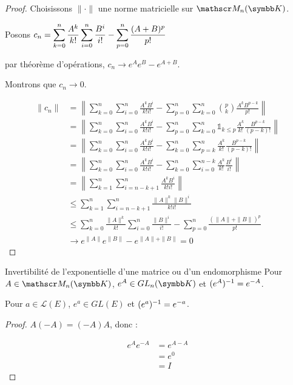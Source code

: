 \begin{proof}
    Choisissons $\| \cdot \|$ une norme matricielle sur $\mathscr M_n(\K)$. 

    Posons $\displaystyle c_n = \sum_{k = 0}^{n} \frac{A^k}{k!} \sum_{i = 0}^{n } \frac{B^i}{i!} - \sum_{p = 0}^{n} \frac{(A + B)^p}{p!}$

    par théorème d'opérations, $c_n \to e^A e^B - e^{A + B}$.

    Montrons que $c_n \to 0$.  

    \begin{align}
        \| c_n \| & = \left\| \sum_{k = 0}^{n} \sum_{i = 0}^{n} \frac{A^k B^i}{k! i!} - \sum_{p = 0}^{n} \sum_{k = 0}^{n } \binom p k \frac{A^k B^{p - k}}{p!} \right\| \\
        & = \left\| \sum_{k = 0}^n \sum_{i = 0}^{n} \frac{A^k B^i}{k! i!} - \sum_{p = 0}^{n} \sum_{k = 0}^{n} \mathbb 1_{k \leqslant p} \frac{A^k}{k!} \frac{B^{p - k}}{(p - k)!} \right\| \\
        & = \left\| \sum_{k = 0}^{n} \sum_{i = 0}^{n} \frac{A^k B^i}{k! i!} - \sum_{k = 0}^{n} \sum_{p = k}^n \frac{A^k}{k!} \frac{B^{p - k}}{(p - k)!} \right\| \\
        & = \left\| \sum_{k = 0}^{n} \sum_{i = 0}^{n} \frac{A^k B^i}{k! i!} - \sum_{k = 0}^{n} \sum_{i = 0}^{n - k} \frac{A^k}{k!} \frac{B^{i}}{i!} \right\| \\
        & = \left\| \sum_{k = 1}^n \sum_{i = n - k + 1}^{n} \frac{A^k B^i}{k! i!} \right\| \\
        & \leqslant \sum_{k = 1}^{n } \sum_{i = n - k + 1}^{n} \frac{\| A \|^k \| B \|^i}{k! i!} \\
        & \leqslant \sum_{k = 0}^{n} \frac{\| A \|^k}{k!} \sum_{i = 0}^n \frac{\| B \|^i}{i!} - \sum_{p = 0}^{n} \frac{(\| A \| + \| B \|)^p}{p!} \\
        & \to e^{\| A \|} e^{\| B \|} - e^{\| A \| + \| B \|} = 0
    \end{align}
\end{proof}

\begin{corollairent}{Invertibilité de l'exponentielle d'une matrice ou d'un endomorphisme}{}
    Pour $A \in \mathscr M_n(\K)$, $e^A \in GL_n(\K)$ et $(e^A)^{-1} = e^{-A}$.

    Pour $a \in \mathscr L(E)$, $e^a \in GL(E)$ et $(e^a)^{-1} = e^{-a}$.
\end{corollairent}

\begin{proof}
    $A(-A) = (-A)A$, donc : 

    \begin{align}
        e^A e^{-A} & = e^{A - A} \\
        & = e^0 \\
        & = I
    \end{align}
\end{proof}

